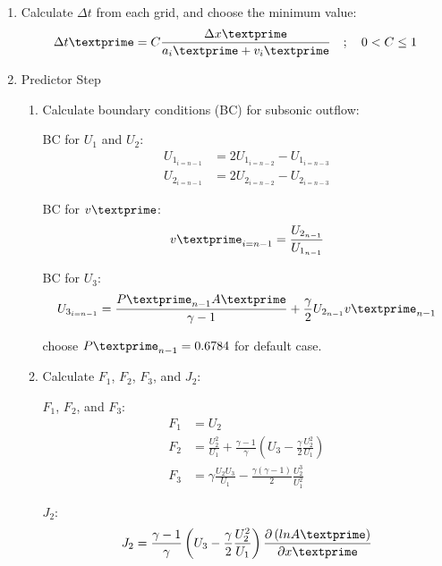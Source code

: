 \documentclass[12pt]{article}
\begin{document}
\begin{enumerate}
\begin{enumerate}
		\item Calculate $\Delta t$ from each grid, and choose the minimum value:
			\begin{equation}
				\Delta t\textprime = C\frac{\Delta x\textprime}{a_{i}\textprime + v_{i}\textprime}\hspace{1em};\hspace{1em}0 < C \leq 1
			\end{equation}
		\item Predictor Step
		\begin{enumerate}
			\item Calculate boundary conditions (BC) for subsonic outflow:
				\par BC for $U_{1}$ and $U_{2}$:
				\begin{align}
					U_{1_{i=n-1}} &= 2U_{1_{i=n-2}} - U_{1_{i=n-3}} \\
					U_{2_{i=n-1}} &= 2U_{2_{i=n-2}} - U_{2_{i=n-3}}
				\end{align}
				\par BC for $v\textprime$:
				\begin{equation}
					v\textprime_{i=n-1} = \frac{U_{2_{n-1}}}{U_{1_{n-1}}}
				\end{equation}
				\par BC for $U_{3}$:
				\begin{equation}
					U_{3_{i=n-1}} 	= \frac{P\textprime_{n-1}A\textprime}{\gamma - 1} + \frac{\gamma}{2}U_{2_{n-1}}v\textprime_{n-1} \\
				\end{equation}
				\par choose $P\textprime_{n-1} = 0.6784$ for default case.
			\item Calculate $F_{1}$, $F_{2}$, $F_{3}$, and $J_{2}$:
				\par $F_{1}$, $F_{2}$, and $F_{3}$:
				\begin{align}
					F_{1}	&= U_{2} \\
					F_{2}	&= \frac{U_{2}^{2}}{U_{1}} + \frac{\gamma - 1}{\gamma}\left(U_{3} - \frac{\gamma}{2}\frac{U_{2}^{2}}{U_{1}}\right) \\
					F_{3}	&= \gamma\frac{U_{2}U_{3}}{U_{1}} - \frac{\gamma\left(\gamma - 1\right)}{2}\frac{U_{2}^{3}}{U_{1}^{2}}
				\end{align}
				\par $J_{2}$:
				\begin{align}
					J_{2} 	&= \frac{\gamma - 1}{\gamma}\left(U_{3} - \frac{\gamma}{2}\frac{U_{2}^{2}}{U_{1}}\right)\frac{\partial\left(ln A\textprime\right)}{\partial x\textprime} \\

\end{align}
\end{enumerate}
\end{enumerate}
\end{enumerate}
\end{document}
